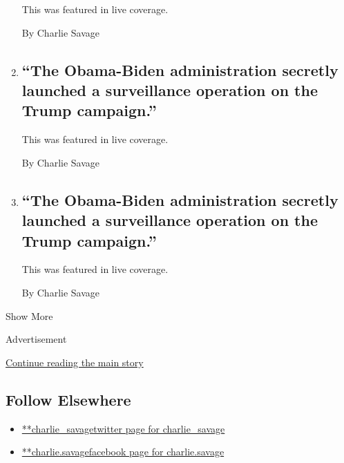 \begin{enumerate}
  This was featured in live coverage.

  By Charlie Savage
\item
  \href{/2020/08/26/us/politics/the-obama-biden-administration-secretly-launched-a-surveillance-operation-on-the-trump-campaign.html}{}

  \hypertarget{the-obama-biden-administration-secretly-launched-a-surveillance-operation-on-the-trump-campaign}{%
  \subsection{``The Obama-Biden administration secretly launched a
  surveillance operation on the Trump
  campaign.''}\label{the-obama-biden-administration-secretly-launched-a-surveillance-operation-on-the-trump-campaign}}

  This was featured in live coverage.

  By Charlie Savage
\item
  \href{/live/2020/08/26/us/rnc-fact-check/the-obama-biden-administration-secretly-launched-a-surveillance-operation-on-the-trump-campaign}{}

  \hypertarget{the-obama-biden-administration-secretly-launched-a-surveillance-operation-on-the-trump-campaign-1}{%
  \subsection{``The Obama-Biden administration secretly launched a
  surveillance operation on the Trump
  campaign.''}\label{the-obama-biden-administration-secretly-launched-a-surveillance-operation-on-the-trump-campaign-1}}

  This was featured in live coverage.

  By Charlie Savage
\end{enumerate}

Show More

Advertisement

\protect\hyperlink{after-mid2}{Continue reading the main story}

\hypertarget{follow-elsewhere}{%
\subsection{Follow Elsewhere}\label{follow-elsewhere}}

\begin{itemize}
\tightlist
\item
  \href{https://twitter.com/charlie_savage}{**charlie\_savagetwitter
  page for charlie\_savage}
\item
  \href{https://www.facebookcorewwwi.onion/charlie.savage}{**charlie.savagefacebook
  page for charlie.savage}
\end{itemize}

